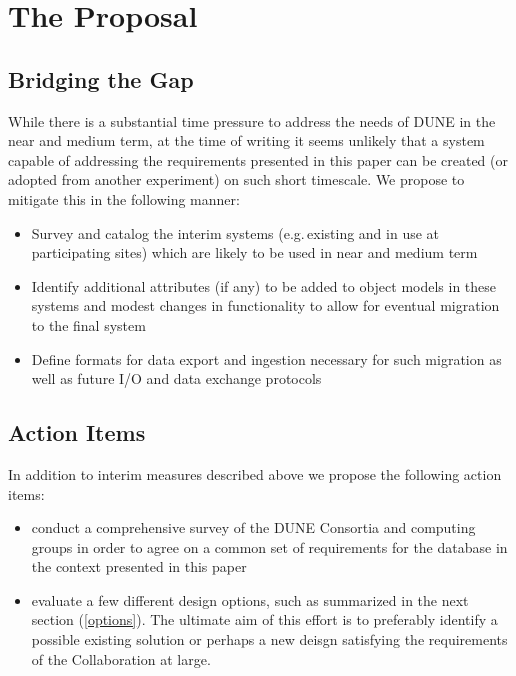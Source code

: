 \documentclass[pdftex,12pt,letter]{article}
\begin{document}
\section{The Proposal}
\subsection{Bridging the Gap}

While there is a substantial time pressure to address the needs of DUNE in the near and medium term,
at the time of writing it seems unlikely that a system capable of addressing the requirements
presented in this paper can be created (or adopted from another experiment) on such short timescale.
We propose to mitigate this in the following manner:

\begin{itemize}

\item Survey and catalog the interim systems (e.g.\,existing and in use at participating sites)
which are likely to be used in near and medium term

\item Identify additional attributes (if any) to be added to object models in these systems
and modest changes in functionality to allow for eventual migration to the final system

\item Define formats for data export and ingestion necessary for such migration as well as future
I/O and data exchange protocols

\end{itemize}

\subsection{Action Items}
In addition to interim measures described above we propose the following action items:
\begin{itemize}

\item conduct a comprehensive survey of the DUNE Consortia and computing groups
in order to agree on a common set of requirements for the database in the context presented
in this paper

\item evaluate a few different design options, such as summarized in the
next section (\ref{options}). The ultimate aim of this effort is to preferably identify a possible
existing solution or perhaps a new deisgn satisfying the requirements of the Collaboration at large. 

\end{itemize}
\end{document}

